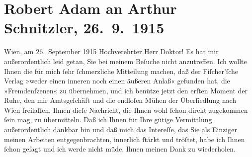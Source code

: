 

         \newcommand{\erwaehnteInstitutionen}{Institutionen: Bezirksgericht Wien Floridsdorf, S. Fischer Verlag}
         \newcommand{\erwaehnteOrte}{Orte: Meidlinger Hauptstraße, Wien, XII., Meidling, XXI., Floridsdorf, Zistersdorf}
         \newcommand{\erwaehnteWerke}{Werke: Der Fremde}
               \section[Robert Adam an Arthur Schnitzler, 26. 9. 1915]{ Robert Adam an Arthur Schnitzler, 26. 9. 1915}\nopagebreak{}\rehead{ }\begin{ledgroupsized}[t]{13cm}\normalsize\beginnumbering \toendnotes[C]{\smallbreak\pagebreak[2]} 
\pstart
           \raggedleft{}{\pb}Wien, am 26. September 1915\pend
           \pstart{}Hochverehrter Herr Doktor!\pend\pstart
           Es hat mir außerordentlich leid getan, Sie bei meinem Beſuche nicht anzutreffen. Ich
               wollte Ihnen die für mich ſehr ſchmerzliche Mitteilung machen, daß der Fiſcher’ſche Verlag »weder einen inneren noch einen
               äußeren Anlaß« gefunden hat, die »Fremdenſzenen« zu
               übernehmen, und ich benütze jetzt den erſten Moment der Ruhe, den mir Amtsgeſchäft
               und die endloſen Mühen der Überſiedlung nach Wien
               freilaſſen, Ihnen dieſe Nachricht, die Ihnen wohl ſchon direkt zugekommen ſein mag,
               zu übermitteln.\pend
           \pstart
           Daß ich Ihnen für Ihre gütige Vermittlung außerordentlich dankbar bin und daß mich
               das {\pb}Intereſſe, das Sie als Einziger meinen Arbeiten
               entgegenbrachten, innerlich ſtärkt und tröſtet, habe ich Ihnen ſchon geſagt und ich
               werde nicht müde, Ihnen meinen Dank zu wiederholen.\pend

\end{ledgroupsized}
